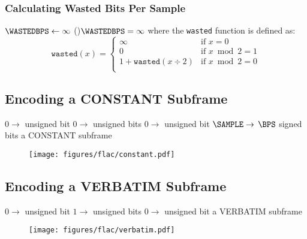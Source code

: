 \subsubsection{Calculating Wasted Bits Per Sample}
\label{flac:calculate_wasted_bps}
{
  $\text{\WASTEDBPS} \leftarrow \infty$
  \eIf(){$\WASTEDBPS = \infty$}{
    \;
  }{
    \Return \WASTEDBPS\;
  }
  \EALGORITHM
  where the \texttt{wasted} function is defined as:
  \begin{equation*}
    \texttt{wasted}(x) =
    \begin{cases}
      \infty & \text{if } x = 0 \\
      0 & \text{if } x \bmod 2 = 1 \\
      1 + \texttt{wasted}(x \div 2) & \text{if } x \bmod 2 = 0 \\
    \end{cases}
  \end{equation*}
}

\clearpage

\subsection{Encoding a CONSTANT Subframe}
\label{flac:encode_constant_subframe}
{
$0 \rightarrow$  unsigned bit
$0 \rightarrow$  unsigned bits
$0 \rightarrow$  unsigned bit
$\text{\SAMPLE} \rightarrow$ \WRITE $\text{\BPS}$ signed bits\;
\Return a CONSTANT subframe\;
\EALGORITHM
}
\begin{figure}[h]
  \texttt{[image: figures/flac/constant.pdf]}
\end{figure}

\subsection{Encoding a VERBATIM Subframe}
\label{flac:encode_verbatim_subframe}
{
$0 \rightarrow$  unsigned bit
$1 \rightarrow$  unsigned bits
$0 \rightarrow$  unsigned bit
\Return a VERBATIM subframe\;
\EALGORITHM
}
\begin{figure}[h]
  \texttt{[image: figures/flac/verbatim.pdf]}
\end{figure}

